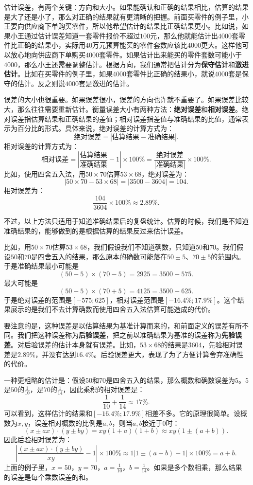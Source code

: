 \documentclass[12pt,UTF8]{ctexbook}
\begin{document}
估计误差，有两个关键：方向和大小。如果能确认和正确的结果相比，估算的结果是大了还是小了，那么对正确的结果就有更清晰的把握。前面买零件的例子里，小王要向供应商下单购买零件，所以他希望估计的结果比正确结果更小。比如说，如果小王通过估计误差知道一套零件报价不超过$100$元，那么他就能估计出$4000$套零件比正确的结果小，实际用$40$万元预算能买的零件套数应该比$4000$更大。这样他可以放心地向供应商下单购买$4000$套零件。如果估计出来能买的零件套数可能小于$4000$，那么小王还需要调整估计。根据方向，我们通常把估计分为\textbf{保守估计}和\textbf{激进估计}。比如在买零件的例子里，如果$4000$套零件比正确的结果小，就说$4000$套是保守的估计。反之则说$4000$套是激进的估计。

误差的大小也很重要。如果误差很小，误差的方向也许就不重要了。如果误差比较大，那么往往需要重新估计。衡量误差大小有两种方法：\textbf{绝对误差}和\textbf{相对误差}。绝对误差指估算结果和正确结果的差值；相对误差指差值与准确结果的比值，通常表示为百分比的形式。具体来说，绝对误差的计算方式为：
$$ \text{绝对误差} = \left|\text{估算结果} - \text{准确结果}\right|. $$
相对误差的计算方式为：
$$ \text{相对误差} = \left|\frac{\text{估算结果}}{\text{准确结果}} - 1\right| \times 100\% = \frac{\text{绝对误差}}{|\text{准确结果}|} \times 100\%. $$
比如，使用四舍五入法，用$50\times 70$估算$53 \times 68$，绝对误差为：
$$  \left|50\times 70 - 53 \times 68\right| = |3500 - 3604| = 104. $$
相对误差为：
$$ \frac{104}{3604} \times 100\% \approx 2.89\%. $$

不过，以上方法只适用于知道准确结果后的复盘统计。估算的时候，我们是不知道准确结果的，能够做到的是根据估算的结果反过来估计误差。

比如，用$50\times 70$估算$53 \times 68$，我们假设我们不知道确数，只知道$50$和$70$。我们假设$50$和$70$是四舍五入的结果，那么原本的确数可能落在$50\pm 5$、$70\pm 5$的范围内。于是准确结果最小可能是
$$ (50 - 5) \times (70 - 5) = 2925 = 3500 - 575.$$
最大可能是
$$ (50 + 5) \times (70 + 5) = 4125 = 3500 + 625.$$
于是绝对误差的范围是$[- 575; 625]$，相对误差范围是$[-16.4\%;17.9\%]$。这个结果展示的是我们不去计算确数而使用四舍五入法估算可能造成的代价。

要注意的是，这种误差是以估算结果为基准计算而来的，和前面定义的误差有所不同。我们把这种误差称为\textbf{后验误差}，把之前以准确结果为基准的误差称为\textbf{先验误差}。对后验误差的估计本身就有误差。比如，$53 \times 68$的结果是$3604$，先验相对误差是$2.89\%$，并没有达到$16.4\%$。后验误差更大，表现了为了方便计算舍弃准确性的代价。

一种更粗略的估计是：假设$50$和$70$是四舍五入的结果，那么概数和确数误差为$5$。$5$是$50$的$\frac{1}{10}$，是$70$的$\frac{1}{14}$，因此乘积的相对误差是：
$$ \frac{1}{10} + \frac{1}{14} \approx 17\%. $$
可以看到，这样估计的结果和$[-16.4\%;17.9\%]$相差不多。它的原理很简单。设概数为$x,y$，误差相对概数的比例是$a,b$，则当$a,b$接近于$0$时：
$$ (x \pm ax) \cdot (y \pm by) = xy (1 + a)(1 + b) \approx xy(1 \pm (a + b)).$$
因此后验相对误差为：
$$ \left|\frac{(x \pm ax) \cdot (y \pm by)}{xy} - 1\right| \times 100\% \approx 1  \left| 1 \pm (a + b) - 1\right| \times 100\%  = a + b. $$
上面的例子里，$x = 50$，$y = 70$，$a = \frac{1}{10}$，$b = \frac{1}{14}$。如果是多个数相乘，那么结果的误差是每个乘数误差的和。
\end{document}
